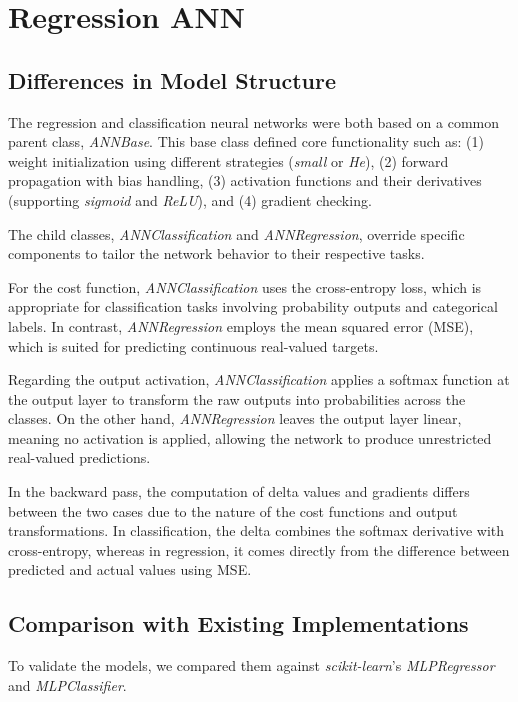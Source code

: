 \documentclass[fleqn,moreauthors,10pt]{ds_report}
\begin{document}
\section{Regression ANN}

\subsection{Differences in Model Structure}
The regression and classification neural networks were both based on a common parent class, \textit{ANNBase}. This base class defined core functionality such as: (1) weight initialization using different strategies (\textit{small} or \textit{He}), (2) forward propagation with bias handling, (3) activation functions and their derivatives (supporting \textit{sigmoid} and \textit{ReLU}), and (4) gradient checking.


The child classes, \textit{ANNClassification} and \textit{ANNRegression}, override specific components to tailor the network behavior to their respective tasks.

For the cost function, \textit{ANNClassification} uses the cross-entropy loss, which is appropriate for classification tasks involving probability outputs and categorical labels. In contrast, \textit{ANNRegression} employs the mean squared error (MSE), which is suited for predicting continuous real-valued targets.

Regarding the output activation, \textit{ANNClassification} applies a softmax function at the output layer to transform the raw outputs into probabilities across the classes. On the other hand, \textit{ANNRegression} leaves the output layer linear, meaning no activation is applied, allowing the network to produce unrestricted real-valued predictions.

In the backward pass, the computation of delta values and gradients differs between the two cases due to the nature of the cost functions and output transformations. In classification, the delta combines the softmax derivative with cross-entropy, whereas in regression, it comes directly from the difference between predicted and actual values using MSE.

\subsection{Comparison with Existing Implementations}
To validate the models, we compared them against \textit{scikit-learn}'s \textit{MLPRegressor} and \textit{MLPClassifier}.
\end{document}
